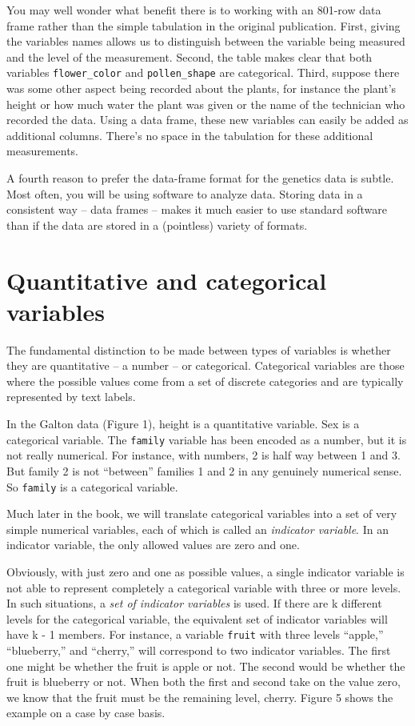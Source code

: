 \documentclass[]{tufte-book}
\begin{document}
You may well wonder what benefit there is to working with an 801-row data frame rather than the simple tabulation in the original publication. First, giving the variables names allows us to distinguish between the variable being measured and the level of the measurement. Second, the table makes clear that both variables \texttt{flower\_color} and \texttt{pollen\_shape} are categorical. Third, suppose there was some other aspect being recorded about the plants, for instance the plant's height or how much water the plant was given or the name of the technician who recorded the data. Using a data frame, these new variables can easily be added as additional columns. There's no space in the tabulation for these additional measurements.

A fourth reason to prefer the data-frame format for the genetics data is subtle. Most often, you will be using software to analyze data. Storing data in a consistent way -- data frames -- makes it much easier to use standard software than if the data are stored in a (pointless) variety of formats.

\hypertarget{quantitative-and-categorical-variables}{%
\section{Quantitative and categorical variables}\label{quantitative-and-categorical-variables}}

The fundamental distinction to be made between types of variables is whether they are quantitative -- a number -- or categorical. Categorical variables are those where the possible values come from a set of discrete categories and are typically represented by text labels.

In the Galton data (Figure 1), height is a quantitative variable. Sex is a categorical variable. The \texttt{family} variable has been encoded as a number, but it is not really numerical. For instance, with numbers, 2 is half way between 1 and 3. But family 2 is not ``between'' families 1 and 2 in any genuinely numerical sense. So \texttt{family} is a categorical variable.

Much later in the book, we will translate categorical variables into a set of very simple numerical variables, each of which is called an \emph{indicator variable}. In an indicator variable, the only allowed values are zero and one.

Obviously, with just zero and one as possible values, a single indicator variable is not able to represent completely a categorical variable with three or more levels. In such situations, a \emph{set of indicator variables} is used. If there are k different levels for the categorical variable, the equivalent set of indicator variables will have k - 1 members. For instance, a variable \texttt{fruit} with three levels ``apple,'' ``blueberry,'' and ``cherry,'' will correspond to two indicator variables. The first one might be whether the fruit is apple or not. The second would be whether the fruit is blueberry or not. When both the first and second take on the value zero, we know that the fruit must be the remaining level, cherry. Figure 5 shows the example on a case by case basis.
\end{document}

